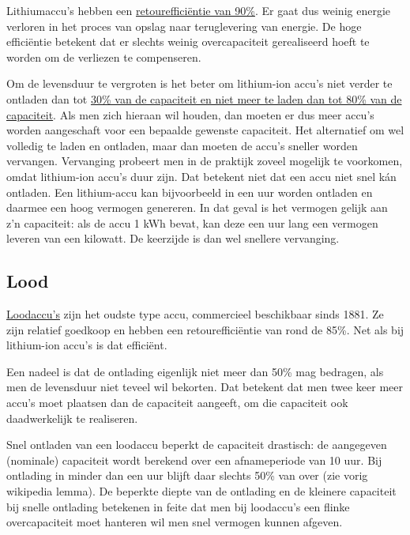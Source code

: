\documentclass[
  11pt,
  a4paper,
]{book}
\begin{document}
Lithiumaccu's hebben een \href{https://en.wikipedia.org/wiki/Comparison_of_commercial_battery_types\#Rechargeable_characteristics}{retourefficiëntie van 90\%}. Er gaat dus weinig energie verloren in het proces van opslag naar teruglevering van energie. De hoge efficiëntie betekent dat er slechts weinig overcapaciteit gerealiseerd hoeft te worden om de verliezen te compenseren.

Om de levensduur te vergroten is het beter om lithium-ion accu's niet verder te ontladen dan tot \href{https://nl.wikipedia.org/wiki/Lithium-ion-accu}{30\% van de capaciteit en niet meer te laden dan tot 80\% van de capaciteit}. Als men zich hieraan wil houden, dan moeten er dus meer accu's worden aangeschaft voor een bepaalde gewenste capaciteit. Het alternatief om wel volledig te laden en ontladen, maar dan moeten de accu's sneller worden vervangen. Vervanging probeert men in de praktijk zoveel mogelijk te voorkomen, omdat lithium-ion accu's duur zijn. Dat betekent niet dat een accu niet snel kán ontladen. Een lithium-accu kan bijvoorbeeld in een uur worden ontladen en daarmee een hoog vermogen genereren. In dat geval is het vermogen gelijk aan z'n capaciteit: als de accu 1 kWh bevat, kan deze een uur lang een vermogen leveren van een kilowatt. De keerzijde is dan wel snellere vervanging.

\hypertarget{lood}{%
\subsection{Lood}\label{lood}}

\href{https://nl.wikipedia.org/wiki/Loodaccu}{Loodaccu's} zijn het oudste type accu, commercieel beschikbaar sinds 1881. Ze zijn relatief goedkoop en hebben een retourefficiëntie van rond de 85\%. Net als bij lithium-ion accu's is dat efficiënt.

Een nadeel is dat de ontlading eigenlijk niet meer dan 50\% mag bedragen, als men de levensduur niet teveel wil bekorten. Dat betekent dat men twee keer meer accu's moet plaatsen dan de capaciteit aangeeft, om die capaciteit ook daadwerkelijk te realiseren.

Snel ontladen van een loodaccu beperkt de capaciteit drastisch: de aangegeven (nominale) capaciteit wordt berekend over een afnameperiode van 10 uur. Bij ontlading in minder dan een uur blijft daar slechts 50\% van over (zie vorig wikipedia lemma). De beperkte diepte van de ontlading en de kleinere capaciteit bij snelle ontlading betekenen in feite dat men bij loodaccu's een flinke overcapaciteit moet hanteren wil men snel vermogen kunnen afgeven.
\end{document}
